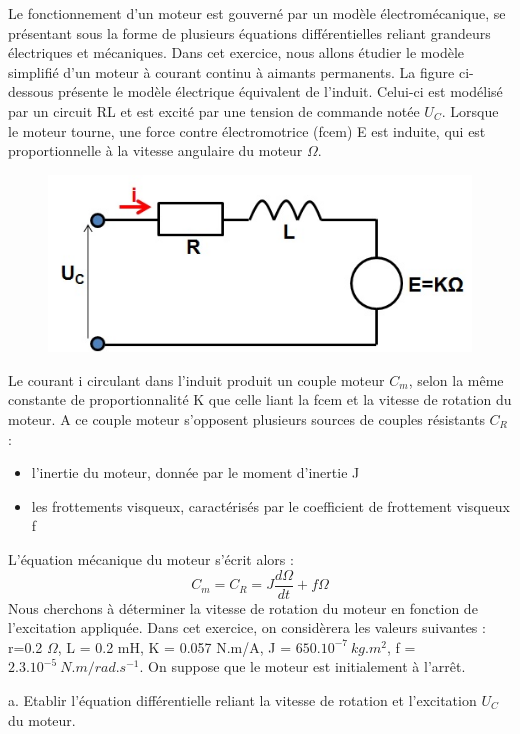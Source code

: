 \documentclass[11pt]{report}
\begin{document}
	Le fonctionnement d'un moteur est gouverné par un modèle électromécanique, se présentant sous la forme de plusieurs équations différentielles reliant grandeurs électriques et mécaniques. Dans cet exercice, nous allons étudier le modèle simplifié d'un moteur à courant continu à aimants permanents. La figure ci-dessous présente le modèle électrique équivalent de l'induit. Celui-ci est modélisé par un circuit RL et est excité par une tension de commande notée $U_{C}$. Lorsque le moteur tourne, une force contre électromotrice (fcem) E est induite, qui est proportionnelle à la vitesse angulaire du moteur $\Omega$. 
	\begin{figure}[h!]
		\centering
		\includegraphics[scale=0.5]{images/Exo3_moteur.jpg} 
	\end{figure}	
	Le courant i circulant dans l'induit produit un couple moteur $C_{m}$, selon la même constante de proportionnalité K que celle liant la fcem et la vitesse de rotation du moteur. A ce couple moteur s'opposent plusieurs sources de couples résistants $C_{R}$ :
	\begin{itemize}
		\item l'inertie du moteur, donnée par le moment d'inertie J
		\item les frottements visqueux, caractérisés par le coefficient de frottement visqueux f
	\end{itemize}
	L'équation mécanique du moteur s'écrit alors :
	\begin{equation*}
		C_{m} = C_{R} = J\frac{d\Omega}{dt}+f\Omega
	\end{equation*}	
	Nous cherchons à déterminer la vitesse de rotation du moteur en fonction de l'excitation appliquée.
	Dans cet exercice, on considèrera les valeurs suivantes : r=0.2 $\Omega$, L = 0.2 mH, K = 0.057 N.m/A, J = $650.10^{-7}~kg.m^{2}$, f = $2.3.10^{-5}~N.m/rad.s^{-1}$. On suppose que le moteur est initialement à l'arrêt.
	
	a. Etablir l'équation différentielle reliant la vitesse de rotation et l'excitation $U_{C}$ du moteur.
	
\end{document}
